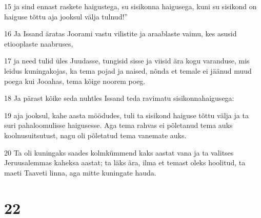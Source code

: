 \par 15 ja sind ennast raskete haigustega, su sisikonna haigusega, kuni su sisikond on haiguse tõttu aja jooksul välja tulnud!”
\par 16 Ja Issand äratas Joorami vastu vilistite ja araablaste vaimu, kes asusid etiooplaste naabruses,
\par 17 ja need tulid üles Juudasse, tungisid sisse ja viisid ära kogu varanduse, mis leidus kuningakojas, ka tema pojad ja naised, nõnda et temale ei jäänud muud poega kui Jooahas, tema kõige noorem poeg.
\par 18 Ja pärast kõike seda nuhtles Issand teda ravimatu sisikonnahaigusega:
\par 19 aja jooksul, kahe aasta möödudes, tuli ta sisikond haiguse tõttu välja ja ta suri pahaloomulisse haigusesse. Aga tema rahvas ei põletanud tema auks koolnusuitsutust, nagu oli põletatud tema vanemate auks.
\par 20 Ta oli kuningaks saades kolmkümmend kaks aastat vana ja ta valitses Jeruusalemmas kaheksa aastat; ta läks ära, ilma et temast oleks hoolitud, ta maeti Taaveti linna, aga mitte kuningate hauda.

\chapter{22}

